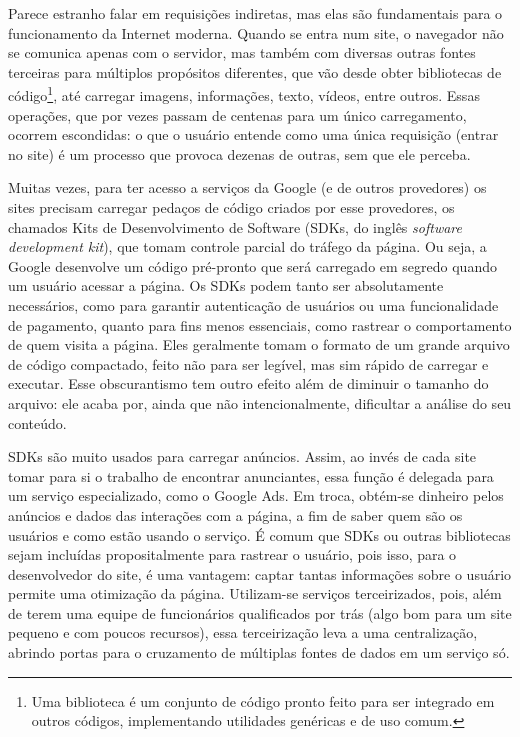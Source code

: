 Parece estranho falar em requisições indiretas, mas elas são fundamentais para o funcionamento da Internet moderna.
Quando se entra num site, o navegador não se comunica apenas com o servidor, mas também com diversas outras fontes terceiras para múltiplos propósitos diferentes, que vão desde obter bibliotecas de código\footnote{Uma biblioteca é um conjunto de código pronto feito para ser integrado em outros códigos, implementando utilidades genéricas e de uso comum.}, até carregar imagens, informações, texto, vídeos, entre outros.
Essas operações, que por vezes passam de centenas para um único carregamento, ocorrem escondidas: o que o usuário entende como uma única requisição (entrar no site) é um processo que provoca dezenas de outras, sem que ele perceba.

Muitas vezes, para ter acesso a serviços da Google (e de outros provedores) os sites precisam carregar pedaços de código criados por esse provedores, os chamados Kits de Desenvolvimento de Software (SDKs, do inglês \textit{software development kit}), que tomam controle parcial do tráfego da página.
Ou seja, a Google desenvolve um código pré-pronto que será carregado em segredo quando um usuário acessar a página.
Os SDKs podem tanto ser absolutamente necessários, como para garantir autenticação de usuários ou uma funcionalidade de pagamento, quanto para fins menos essenciais, como rastrear o comportamento de quem visita a página.
Eles geralmente tomam o formato de um grande arquivo de código compactado, feito não para ser legível, mas sim rápido de carregar e executar.
Esse obscurantismo tem outro efeito além de diminuir o tamanho do arquivo: ele acaba por, ainda que não intencionalmente, dificultar a análise do seu conteúdo.

SDKs são muito usados para carregar anúncios.
Assim, ao invés de cada site tomar para si o trabalho de encontrar anunciantes, essa função é delegada para um serviço especializado, como o Google Ads.
Em troca, obtém-se dinheiro pelos anúncios e dados das interações com a página, a fim de saber quem são os usuários e como estão usando o serviço.
É comum que SDKs ou outras bibliotecas sejam incluídas propositalmente para rastrear o usuário, pois isso, para o desenvolvedor do site, é uma vantagem: captar tantas informações sobre o usuário permite uma otimização da página.
Utilizam-se serviços terceirizados, pois, além de terem uma equipe de funcionários qualificados por trás (algo bom para um site pequeno e com poucos recursos), essa terceirização leva a uma centralização, abrindo portas para o cruzamento de múltiplas fontes de dados em um serviço só.

